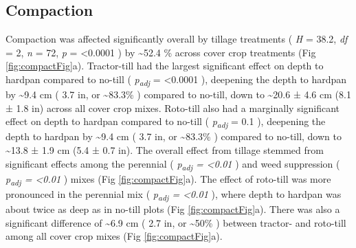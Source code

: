 \documentclass[
  12pt,
]{article}
\begin{document}
\hypertarget{compaction}{%
\subsection{Compaction}\label{compaction}}

Compaction was affected significantly overall by tillage treatments (
\emph{H} = 38.2,
\emph{df} = 2,
\emph{n} = 72,
\emph{p} = \textless0.0001
) by
\textasciitilde52.4 \%
across cover crop treatments (Fig \ref{fig:compactFig}a).
Tractor-till had the largest significant effect on depth to hardpan compared to no-till (
\emph{p\textsubscript{adj}} = \textless0.0001
),
deepening the depth to hardpan by
\textasciitilde9.4 cm (
3.7 in,
or \textasciitilde83.3\%
) compared to no-till,
down to
\textasciitilde20.6 ±
4.6 cm
(8.1 ±
1.8 in)
across all cover crop mixes.
Roto-till also had a marginally significant effect on depth to hardpan compared to no-till (
\emph{p\textsubscript{adj}} = 0.1
),
deepening the depth to hardpan by
\textasciitilde9.4 cm (
3.7 in,
or \textasciitilde83.3\%
) compared to no-till, down to
\textasciitilde13.8 ±
1.9 cm
(5.4 ±
0.7 in).
The overall effect from tillage stemmed from significant effects among the perennial (
\emph{p\textsubscript{adj} = \textless0.01}
) and weed suppression (
\emph{p\textsubscript{adj} = \textless0.01}
) mixes (Fig \ref{fig:compactFig}a).
The effect of roto-till was more pronounced in the perennial mix (
\emph{p\textsubscript{adj} = \textless0.01}
), where depth to hardpan was about twice as deep as in no-till plots (Fig \ref{fig:compactFig}a).
There was also a significant difference of
\textasciitilde6.9 cm (
2.7 in,
or \textasciitilde50\%
) between tractor- and roto-till among all cover crop mixes (Fig \ref{fig:compactFig}a).
\end{document}
